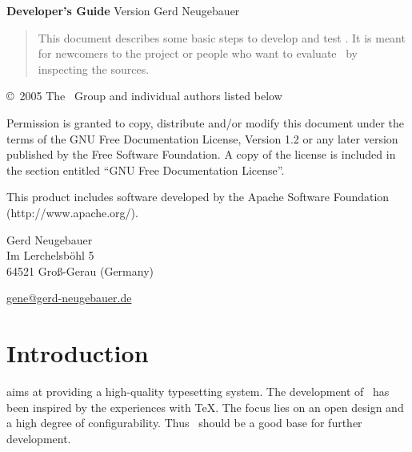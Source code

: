 \documentclass{extex-doc}
\begin{document}

\begin{titlepage}
  \parindent=0pt
  \begin{center}
  \vspace*{1pt}
  \vfill
  \ExTeXbox
  \vfill
  \textsf{\bfseries\Huge Developer's Guide}
  \vfill
  \textsf{\Large Version \Version}
  \vfill
  \textsf{\large Gerd Neugebauer}
  \vfill
  \vfill

  \begin{abstract}\parindent=0pt
    This document describes some basic steps to develop and test
    \ExTeX.  It is meant for newcomers to the project or people who
    want to evaluate \ExTeX\ by inspecting the sources.
  \end{abstract}
  \end{center}
\newpage
\footnotesize
\copyright\ 2005 The \ExTeX\ Group and individual authors listed below 
\medskip

Permission is granted to copy, distribute and/or modify this document
under the terms of the GNU Free Documentation License, Version 1.2 or
any later version published by the Free Software Foundation. A copy of
the license is included in the section entitled ``GNU Free
Documentation License''.
\bigskip

This product includes software developed by the Apache Software
Foundation (http://www.apache.org/).

\vfill

Gerd Neugebauer\\
Im Lerchelsb\"ohl 5\\
64521 Gro\ss-Gerau (Germany)
\smallskip

\href{mailto://gene@gerd-neugebauer.de}{gene@gerd-neugebauer.de}

\end{titlepage}

\tableofcontents
\newpage

\chapter{Introduction}

\ExTeX{} aims at providing a high-quality typesetting system. The
development of \ExTeX\ has been inspired by the experiences with \TeX.
The focus lies on an open design and a high degree of configurability.
Thus \ExTeX\ should be a good base for further development.
\end{document}
